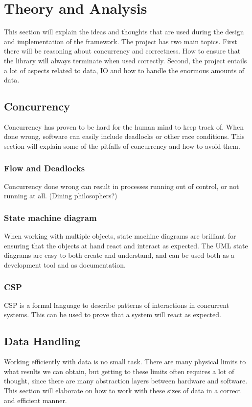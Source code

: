 \documentclass[a4paper]{article}
\begin{document}
\section{Theory and Analysis}
This section will explain the ideas and thoughts that are used during the design and implementation of the framework.
The project has two main topics. First there will be reasoning about concurrency and correctness. How to ensure that the
library will always terminate when used correctly. Second, the project entails a lot of aspects related to data, IO and
how to handle the enormous amounts of data.


\subsection{Concurrency}
Concurrency has proven to be hard for the human mind to keep track of. When done wrong, software can easily
include deadlocks or other race conditions. This section will explain some of the pitfalls of concurrency
and how to avoid them.


\subsubsection{Flow and Deadlocks}
Concurrency done wrong can result in processes running out of control, or not running at all. (Dining philosophers?)


\subsubsection{State machine diagram}
When working with multiple objects, state machine diagrams are brilliant for ensuring that the objects at hand react and
interact as expected. The UML state diagrams are easy to both create and understand, and can be used both as a development
tool and as documentation.



\subsubsection{CSP}
CSP is a formal language to describe patterns of interactions in concurrent systems. This can be used to prove that a system
will react as expected.






\subsection{Data Handling}
Working efficiently with data is no small task. There are many physical limits to what results we can obtain, but getting
to these limits often requires a lot of thought, since there are many abstraction layers between hardware and software. This section
will elaborate on how to work with these sizes of data in a correct and efficient manner.
\end{document}
